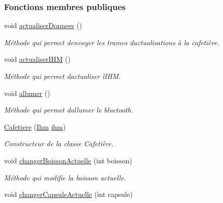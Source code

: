 \subsubsection*{Fonctions membres publiques}
\begin{DoxyCompactItemize}
\item 
void \hyperlink{classcom_1_1example_1_1ekawa_1_1_cafetiere_a1c6b2ea0e069cda876260e18ea8f6e84}{actualiser\+Donnees} ()
\begin{DoxyCompactList}\small\item\em Méthode qui permet d\textquotesingle{}envoyer les trames d\textquotesingle{}actualisations à la cafetière. \end{DoxyCompactList}\item 
void \hyperlink{classcom_1_1example_1_1ekawa_1_1_cafetiere_ad8c8b7d410315f55a216de809571fd87}{actualiser\+I\+HM} ()
\begin{DoxyCompactList}\small\item\em Méthode qui permet d\textquotesingle{}actualiser l\textquotesingle{}I\+HM. \end{DoxyCompactList}\item 
void \hyperlink{classcom_1_1example_1_1ekawa_1_1_cafetiere_afa405dc114a82fe74c06ff0971fa6cfc}{allumer} ()
\begin{DoxyCompactList}\small\item\em Méthode qui permet d\textquotesingle{}allumer le bluetooth. \end{DoxyCompactList}\item 
\hyperlink{classcom_1_1example_1_1ekawa_1_1_cafetiere_a8a8b762148526c605b13daeaf9d2e7cb}{Cafetiere} (\hyperlink{classcom_1_1example_1_1ekawa_1_1_ihm}{Ihm} \hyperlink{classcom_1_1example_1_1ekawa_1_1_cafetiere_a7db4a63088834eda5f6a3e951611bf82}{ihm})
\begin{DoxyCompactList}\small\item\em Constructeur de la classe Cafetière. \end{DoxyCompactList}\item 
void \hyperlink{classcom_1_1example_1_1ekawa_1_1_cafetiere_a50775b093a7f6d1b0fe8ad3662d80fc5}{changer\+Boisson\+Actuelle} (int boisson)
\begin{DoxyCompactList}\small\item\em Méthode qui modifie la boisson actuelle. \end{DoxyCompactList}\item 
void \hyperlink{classcom_1_1example_1_1ekawa_1_1_cafetiere_a686b4e821ea9164323753eb123576921}{changer\+Capsule\+Actuelle} (int capsule)

\end{DoxyCompactItemize}
